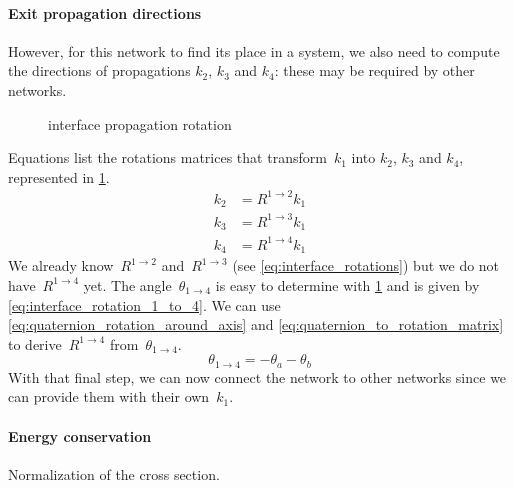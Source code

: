 \paragraph{Exit propagation directions}
However, for this network to find its place in a system, we also need to compute the directions of propagations $k_2$, $k_3$ and $k_4$: these may be required by other networks.

\begin{figure}[hbtp]
    \centering
    \caption{\label{fig:interface_propagation_rotation}interface propagation rotation}
\end{figure}
Equations  list the rotations matrices that transform~$k_1$ into $k_2$, $k_3$ and $k_4$, represented in \cref{fig:interface_propagation_rotation}.
\begin{subequations}
    \begin{align}
        k_2 &= R^{1 \rightarrow 2} k_1 \label{eq:interface_propagation_rotation_k2} \\
        k_3 &= R^{1 \rightarrow 3} k_1 \label{eq:interface_propagation_rotation_k3} \\
        k_4 &= R^{1 \rightarrow 4} k_1 \label{eq:interface_propagation_rotation_k4}
    \end{align}
    \label{eq:interface_propagation_rotation_ki}
\end{subequations}
We already know~$R^{1 \rightarrow 2}$ and~$R^{1 \rightarrow 3}$ (see \cref{eq:interface_rotations}) but we do not have~$R^{1 \rightarrow 4}$ yet.
The angle~$\theta_{1 \rightarrow 4}$ is easy to determine with \cref{fig:interface_propagation_rotation} and is given by \cref{eq:interface_rotation_1_to_4}.
We can use \cref{eq:quaternion_rotation_around_axis} and \cref{eq:quaternion_to_rotation_matrix} to derive~$R^{1 \rightarrow 4}$ from~$\theta_{1 \rightarrow 4}$.
\begin{equation}
    \theta_{1 \rightarrow 4} = -\theta_a - \theta_b
    \label{eq:interface_rotation_1_to_4}
\end{equation}
With that final step, we can now connect the network to other networks since we can provide them with their own~$k_1$.


\paragraph{Energy conservation}
Normalization of the cross section.


